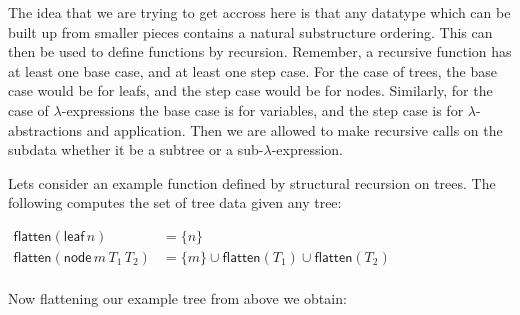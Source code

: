 \documentclass{article}
\begin{document}
The idea that we are trying to get accross here is that any datatype
which can be built up from smaller pieces contains a natural
substructure ordering.  This can then be used to define functions by
recursion.  Remember, a recursive function has at least one base case,
and at least one step case.  For the case of trees, the base case
would be for leafs, and the step case would be for nodes.  Similarly,
for the case of $\lambda$-expressions the base case is for variables,
and the step case is for $\lambda$-abstractions and application.  Then
we are allowed to make recursive calls on the subdata whether it be a
subtree or a sub-$\lambda$-expression.  

Lets consider an example function defined by structural recursion on
trees.  The following computes the set of tree data given any tree:
\begin{center}
  \begin{math}
    \begin{array}{rll}
      \mathsf{flatten}(\mathsf{leaf}\,n) & = \{ n \}\\
      \mathsf{flatten}(\mathsf{node}\,m\,T_1\,T_2) & = \{m\} \cup \mathsf{flatten}(T_1) \cup \mathsf{flatten}(T_2)\\
    \end{array}
  \end{math}
\end{center}
Now flattening our example tree from above we obtain:
\end{document}
